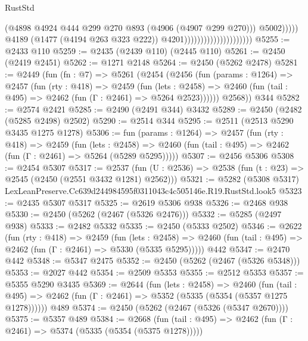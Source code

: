 \begin{lexlean}{RustStd}
\begin{coremodule}
                                                        (@4898
                                                          @4924
                                                          @444
                                                          @299
                                                          @270
                                                          @893
                                                          (@4906 (@4907 @299 @270)))
                                                        @5002)))))
                                              @4189
                                              (@1477 (@4194 @263 @323 @222))
                                              @4201)))))))))))))))))))))
@5255 := @2433 @110
@5259 := @2435 (@2439 @110) (@2445 @110)
@5261 := @2450 (@2419 @2451)
@5262 := @1271 @2148
@5264 := @2450 (@5262 @2478)
@5281 := @2449
    (fun (fn : @7) =>
    @5261
      (@2454
        (@2456
          (fun (params : @1264) =>
          @2457
            (fun (rty : @418) =>
            @2459
              (fun (lets : @2458) =>
              @2460 (fun (tail : @495) => @2462 (fun (Γ : @2461) => @5264 @2523))))))
        @2568))
    @344
@5282 := @2574 @2421
@5285 := @2490 (@2491 @344) @3432
@5289 := @2450 (@2482 (@5285 @2498) @2502)
@5290 := @2514 @344
@5295 := @2511 (@2513 @5290 @3435 @1275 @1278)
@5306 := fun (params : @1264) =>
  @2457
    (fun (rty : @418) =>
    @2459
      (fun (lets : @2458) =>
      @2460 (fun (tail : @495) => @2462 (fun (Γ : @2461) => @5264 (@5289 @5295)))))
@5307 := @2456 @5306
@5308 := @2454 @5307
@5317 := @2537 (fun (U : @2536) => @2538 (fun (t : @23) => @2545 (@2450 (@2551 @3432 @1281) @2562)))
@5321 := @5282 (@5308 @5317) LexLeanPreserve.Cc639d244984595f0311043c4c505146e.R19.RustStd.look5
@5323 := @2435 @5307 @5317
@5325 := @2619 @5306 @938
@5326 := @2468 @938
@5330 := @2450 (@5262 (@2467 (@5326 @2476)))
@5332 := @5285 (@2497 @938)
@5333 := @2482 @5332
@5335 := @2450 (@5333 @2502)
@5346 := @2622
    (fun (rty : @418) =>
    @2459
      (fun (lets : @2458) =>
      @2460 (fun (tail : @495) => @2462 (fun (Γ : @2461) => @5330 (@5335 @5295)))))
    @442
@5347 := @2470 @442
@5348 := @5347 @2475
@5352 := @2450 (@5262 (@2467 (@5326 @5348)))
@5353 := @2027 @442
@5354 := @2509 @5353
@5355 := @2512 @5353
@5357 := @5355 @5290 @3435
@5369 := @2644
    (fun (lets : @2458) =>
    @2460
      (fun (tail : @495) => @2462 (fun (Γ : @2461) => @5352 (@5335 (@5354 (@5357 @1275 @1278))))))
    @489
@5374 := @2450 (@5262 (@2467 (@5326 (@5347 @2670))))
@5375 := @5357 @489
@5384 := @2668
    (fun (tail : @495) => @2462 (fun (Γ : @2461) => @5374 (@5335 (@5354 (@5375 @1278)))))

\end{coremodule}
\end{lexlean}
